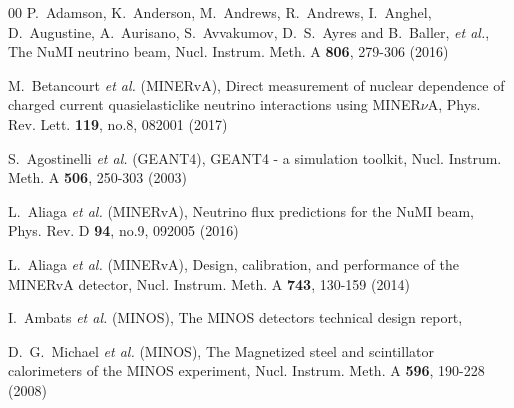 \documentclass[aps,prl,twocolumn,superscriptaddress,nofootinbib]{revtex4-1}
\begin{document}
\begin{thebibliography}{00}
P.~Adamson, K.~Anderson, M.~Andrews, R.~Andrews, I.~Anghel, D.~Augustine, A.~Aurisano, S.~Avvakumov, D.~S.~Ayres and B.~Baller, \textit{et al.},
The NuMI neutrino beam,
Nucl. Instrum. Meth. A \textbf{806}, 279-306 (2016)

M.~Betancourt \textit{et al.} (MINERvA),
Direct measurement of nuclear dependence of charged current quasielasticlike neutrino interactions using MINER$\nu$A,
Phys. Rev. Lett. \textbf{119}, no.8, 082001 (2017)

S.~Agostinelli \textit{et al.} (GEANT4),
GEANT4 - a simulation toolkit,
Nucl. Instrum. Meth. A \textbf{506}, 250-303 (2003)

L.~Aliaga \textit{et al.} (MINERvA),
Neutrino flux predictions for the NuMI beam,
Phys. Rev. D \textbf{94}, no.9, 092005 (2016)

L.~Aliaga \textit{et al.} (MINERvA),
Design, calibration, and performance of the MINERvA detector,
Nucl. Instrum. Meth. A \textbf{743}, 130-159 (2014)

I.~Ambats \textit{et al.} (MINOS),
The MINOS detectors technical design report,

D.~G.~Michael \textit{et al.} (MINOS),
The Magnetized steel and scintillator calorimeters of the MINOS experiment,
Nucl. Instrum. Meth. A \textbf{596}, 190-228 (2008)


\end{thebibliography}
\end{document}
